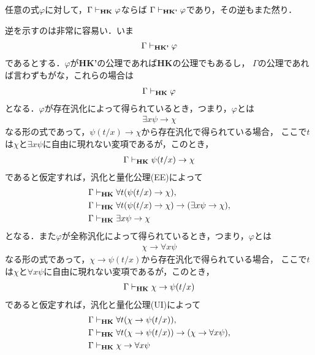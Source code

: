 	\begin{screen}
		\begin{metathm}[{\bf HK}と{\bf HK'}は同値]
			任意の式$\varphi$に対して，$\Gamma \vdash_{{\scriptsize \mbox{{\bf HK}}}} \varphi$ならば
			$\Gamma \vdash_{{\scriptsize \mbox{{\bf HK'}}}} \varphi$であり，その逆もまた然り．
		\end{metathm}
	\end{screen}
	
	逆を示すのは非常に容易い．いま
	\begin{align}
		\Gamma \vdash_{{\scriptsize \mbox{{\bf HK'}}}} \varphi
	\end{align}
	であるとする．$\varphi$が{\bf HK'}の公理であれば{\bf HK}の公理でもあるし，
	$\Gamma$の公理であれば言わずもがな，これらの場合は
	\begin{align}
		\Gamma \vdash_{{\scriptsize \mbox{{\bf HK}}}} \varphi
	\end{align}
	となる．$\varphi$が存在汎化によって得られているとき，つまり，$\varphi$とは
	\begin{align}
		\exists x \psi \rightarrow \chi
	\end{align}
	なる形の式であって，$\psi(t/x) \rightarrow \chi$から存在汎化で得られている場合，
	ここで$t$は$\chi$と$\exists x \psi$に自由に現れない変項であるが，このとき，
	\begin{align}
		\Gamma \vdash_{{\scriptsize \mbox{{\bf HK}}}} \psi(t/x) \rightarrow \chi
	\end{align}
	であると仮定すれば，汎化と量化公理(EE)によって
	\begin{align}
		\Gamma &\vdash_{{\scriptsize \mbox{{\bf HK}}}} \forall t(\psi(t/x) \rightarrow \chi), \\
		\Gamma &\vdash_{{\scriptsize \mbox{{\bf HK}}}} \forall t(\psi(t/x) \rightarrow \chi)
			\rightarrow (\exists x \psi \rightarrow \chi), \\
		\Gamma &\vdash_{{\scriptsize \mbox{{\bf HK}}}} \exists x \psi \rightarrow \chi
	\end{align}
	となる．また$\varphi$が全称汎化によって得られているとき，つまり，$\varphi$とは
	\begin{align}
		\chi \rightarrow \forall x \psi
	\end{align}
	なる形の式であって，$\chi \rightarrow \psi(t/x)$から存在汎化で得られている場合，
	ここで$t$は$\chi$と$\forall x \psi$に自由に現れない変項であるが，このとき，
	\begin{align}
		\Gamma \vdash_{{\scriptsize \mbox{{\bf HK}}}} \chi \rightarrow \psi(t/x)
	\end{align}
	であると仮定すれば，汎化と量化公理(UI)によって
	\begin{align}
		\Gamma &\vdash_{{\scriptsize \mbox{{\bf HK}}}} \forall t(\chi \rightarrow \psi(t/x)), \\
		\Gamma &\vdash_{{\scriptsize \mbox{{\bf HK}}}} \forall t(\chi \rightarrow \psi(t/x))
			\rightarrow (\chi \rightarrow \forall x \psi), \\
		\Gamma &\vdash_{{\scriptsize \mbox{{\bf HK}}}} \chi \rightarrow \forall x \psi
	\end{align}
